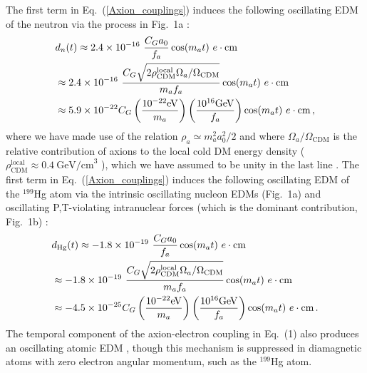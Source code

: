The first term in Eq.~(\ref{Axion_couplings}) induces the following oscillating EDM of the neutron via the process in Fig.~1a \cite{Graham2011,Stadnik2014A,Witten1979,Pospelov1999}:
\begin{align}
\label{nEDM_axion}
&d_n(t) \approx 2.4 \times 10^{-16} ~ \frac{C_G a_0}{f_a} \cos(m_a t) ~ e \cdot \textrm{cm} \notag \\
&\approx 2.4 \times 10^{-16} ~ \frac{C_G \sqrt{2 \rho_{\textrm{CDM}}^{\textrm{local}} \Omega_a / \Omega_{\textrm{CDM}}}}{m_a f_a} \cos(m_a t) ~  e \cdot \textrm{cm} \notag \\
&\approx 5.9 \times 10^{-22} C_G \left( \frac{10^{-22} \textrm{eV}}{m_a} \right) \left( \frac{10^{16} \textrm{GeV}}{f_a} \right)  \cos(m_a t) ~ e \cdot \textrm{cm} \, ,
\end{align}
where we have made use of the relation $\rho_a \simeq m_a^2 a_0^2 /2$ and where $\Omega_a / \Omega_{\textrm{CDM}}$ is the relative contribution of axions to the local cold DM energy density ($\rho_{\textrm{CDM}}^{\textrm{local}} \approx 0.4~\textrm{GeV/cm}^3$ \cite{Catena2010}), which we have assumed to be unity in the last line \cite{footnote2,footnote3}.
The first term in Eq.~(\ref{Axion_couplings}) induces the following oscillating EDM of the $^{199}$Hg atom via the intrinsic oscillating nucleon EDMs (Fig.~1a) and oscillating P,T-violating intranuclear forces (which is the dominant contribution, Fig.~1b) \cite{Stadnik2014A,Flambaum1984EDM,Flambaum1985EDM,Flambaum2002EDM,Dmitriev2003A,Dmitriev2005,Engel2005,Engel2010}:
\begin{align}
\label{199Hg-EDM_axion}
&d_{\textrm{Hg}}(t) \approx -1.8 \times 10^{-19} ~ \frac{C_G a_0}{f_a} \cos(m_a t) ~ e \cdot \textrm{cm} \notag \\
&\approx -1.8 \times 10^{-19} ~ \frac{C_G \sqrt{2 \rho_{\textrm{CDM}}^{\textrm{local}} \Omega_a / \Omega_{\textrm{CDM}}}}{m_a f_a} \cos(m_a t) ~ e \cdot \textrm{cm} \notag \\
&\approx -4.5 \times 10^{-25} C_G \left( \frac{10^{-22} \textrm{eV}}{m_a} \right) \left( \frac{10^{16} \textrm{GeV}}{f_a} \right)  \cos(m_a t) ~ e \cdot \textrm{cm} \, .
\end{align}
The temporal component of the axion-electron coupling in Eq.~(1) also produces an oscillating atomic EDM \cite{Stadnik2014A,Roberts2014A}, though this mechanism is suppressed in diamagnetic atoms with zero electron angular momentum, such as the $^{199}$Hg atom.


